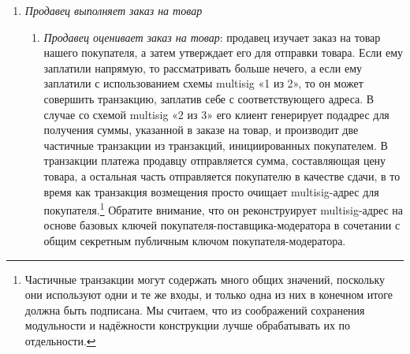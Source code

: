 \begin{enumerate}
\begin{enumerate}
        На самом деле, ему требуются только исходные значения с обязательствами для двух транзакций, а затем по отдельности одна копия частичных образов ключей (с доказательством легитимности) и одна копия подадреса для данного сеанса. Этот подадрес имеет двойное назначение: это адрес покупателя для возврата сфредств или получения выходов сдачи, а его ключ траты является базовым multisig-ключом покупателя.\footnote{Важно создавать отдельные транзакции, поскольку исходные значения с обязательствами можно использовать только один раз.}
        \item {\em Покупатель решается на проведение оплаты}: после просмотра всех деталей заказа на товар покупатель разрешает оплатить его.\footnote{Если покупатель отменяет заказ на приобретение товара, его транзакция с переводом средств и частичные multisig-транзакции удаляются.} Его клиент завершает подписание транзакции перевода средств и отправляет её в сеть.\footnote{Если в его корзине находились товары от нескольких продавцов, его клиент может создать несколько заказов на приобретение товара и обрабатывать их по отдельности. Все продавцы могут получать оплату посредством одной и той же транзакции с переводом средств.} Он отправляет продавцу заказ на товар вместе с хешем транзакции перевода средств и общим секретным публичным ключом покупателя-модератора, а уже затем инициирует multisig-тран\-закции.\footnote{Клиент покупателя должен отслеживать детали платёжного поручения, такие как итоговая цена, чтобы впоследствии проверить содержание multisig-транзакций перед их подписанием.}
    \end{enumerate}{}
    \item {\em Продавец выполняет заказ на товар}
    \begin{enumerate}
        \item {\em Продавец оценивает заказ на товар}: продавец изучает заказ на товар нашего покупателя, а затем утверждает его для отправки товара. Если ему заплатили напрямую, то рассматривать больше нечего, а если ему заплатили с использованием схемы multisig «1 из 2», то он может совершить транзакцию, заплатив себе с соответствующего адреса. В случае со схемой multisig «2 из 3» его клиент генериру\-ет подадрес для получения суммы, указанной в заказе на товар, и производит две частичные транзакции из транзакций, инициированных покупателем. В транзак\-ции платежа продавцу отправляется сумма, составляющая цену товара, а остальная часть отправляется покупателю в качестве сдачи, в то время как транзакция возме\-щения просто очищает multisig-адрес для покупателя.\footnote{Частичные транзакции могут содержать много общих значений, поскольку они используют одни и те же входы, и только одна из них в конечном итоге должна быть подписана. Мы считаем, что из соображений сохранения модульности и надёжности конструкции лучше обрабатывать их по отдельности.} Обратите внимание, что он реконструирует multisig-адрес на основе базовых ключей покупателя-поставщика-модератора в сочетании с общим секретным публичным ключом покупателя-моде\-ратора.

\end{enumerate}
\end{enumerate}
